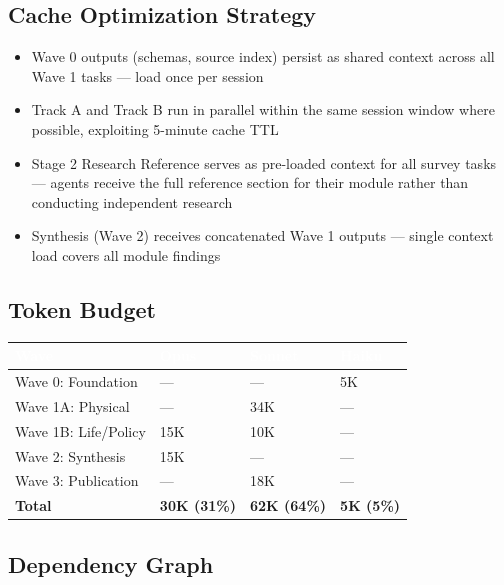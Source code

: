 \documentclass[11pt,letterpaper]{article}
\newcommand{\tableheader}[1]{\textbf{\sffamily\textcolor{white}{#1}}}
\begin{document}
\subsection{Cache Optimization Strategy}
\begin{itemize}[leftmargin=2em]
\item Wave 0 outputs (schemas, source index) persist as shared context across all Wave 1 tasks --- load once per session
\item Track A and Track B run in parallel within the same session window where possible, exploiting 5-minute cache TTL
\item Stage 2 Research Reference serves as pre-loaded context for all survey tasks --- agents receive the full reference section for their module rather than conducting independent research
\item Synthesis (Wave 2) receives concatenated Wave 1 outputs --- single context load covers all module findings
\end{itemize}

\subsection{Token Budget}

\begin{center}
\begin{tabularx}{\textwidth}{L{3.5cm}C{2cm}C{2cm}C{2cm}}
\toprule
{}
\tableheader{Wave} & \tableheader{Opus} & \tableheader{Sonnet} & \tableheader{Haiku} \\
\midrule
Wave 0: Foundation & --- & --- & 5K \\
Wave 1A: Physical & --- & 34K & --- \\
Wave 1B: Life/Policy & 15K & 10K & --- \\
Wave 2: Synthesis & 15K & --- & --- \\
Wave 3: Publication & --- & 18K & --- \\
\midrule
\textbf{Total} & \textbf{30K (31\%)} & \textbf{62K (64\%)} & \textbf{5K (5\%)} \\
\bottomrule
\end{tabularx}
\end{center}

\subsection{Dependency Graph}
\end{document}
